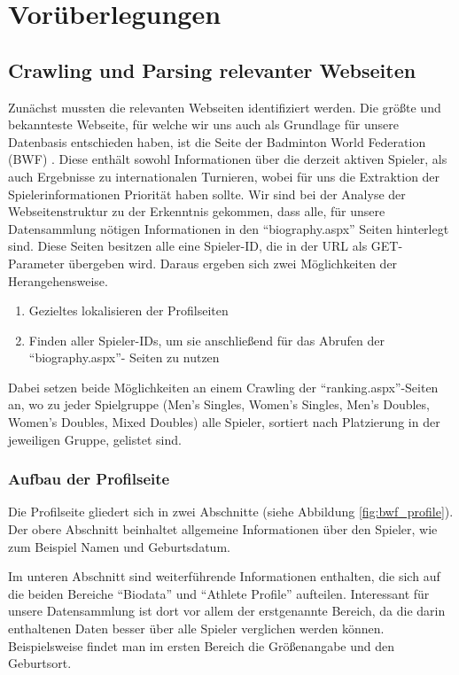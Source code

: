 \chapter{Vorüberlegungen}
\section{Crawling und Parsing relevanter Webseiten}
Zunächst mussten die relevanten Webseiten identifiziert werden. Die größte und bekannteste Webseite, für welche wir uns auch als Grundlage für unsere Datenbasis entschieden haben, ist die Seite der Badminton World Federation (BWF) \cite{BWF2015}. Diese enthält sowohl Informationen über die derzeit aktiven Spieler, als auch Ergebnisse zu internationalen Turnieren, wobei für uns die Extraktion der Spielerinformationen Priorität haben sollte. \newline \newline
Wir sind bei der Analyse der Webseitenstruktur zu der Erkenntnis gekommen, dass alle, für unsere Datensammlung nötigen Informationen in den  "`biography.aspx"' Seiten hinterlegt sind. Diese Seiten besitzen alle eine Spieler-ID, die in der URL als GET-Parameter übergeben wird. Daraus ergeben sich zwei Möglichkeiten der Herangehensweise. 
\begin{enumerate}
\item Gezieltes lokalisieren der Profilseiten
\item Finden aller Spieler-IDs, um sie anschließend für das Abrufen der "`biography.aspx"'- Seiten zu nutzen
\end{enumerate}
Dabei setzen beide Möglichkeiten an einem Crawling der "`ranking.aspx"'-Seiten an, wo zu jeder Spielgruppe (Men's Singles, Women's Singles, Men's Doubles, Women's Doubles, Mixed Doubles) alle Spieler, sortiert nach Platzierung in der jeweiligen Gruppe, gelistet sind.

\subsection{Aufbau der Profilseite}

Die Profilseite gliedert sich in zwei Abschnitte (siehe Abbildung \ref{fig:bwf_profile}). Der obere Abschnitt beinhaltet allgemeine Informationen über den Spieler, wie zum Beispiel Namen und Geburtsdatum. \newline

Im unteren Abschnitt sind weiterführende Informationen enthalten, die sich auf die beiden Bereiche "`Biodata"' und "`Athlete Profile"' aufteilen. Interessant für unsere Datensammlung ist dort vor allem der erstgenannte Bereich, da die darin enthaltenen Daten besser über alle Spieler verglichen werden können. Beispielsweise findet man im ersten Bereich die Größenangabe und den Geburtsort.

